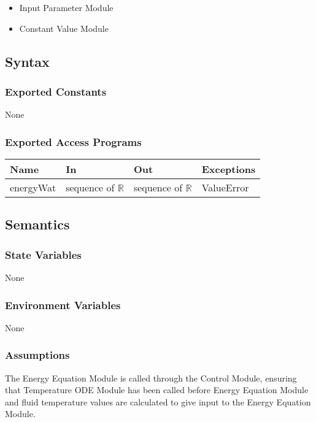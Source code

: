 \documentclass[12pt, titlepage]{article}
\begin{document}
\begin{itemize}
    \item Input Parameter Module
    \item Constant Value Module
\end{itemize}

\subsection{Syntax}

\subsubsection{Exported Constants}
None

\subsubsection{Exported Access Programs}

\begin{center}
\begin{tabular}{p{1.9cm} p{5cm} p{4cm} p{3.5cm}}
\hline
\textbf{Name} & \textbf{In} & \textbf{Out} & \textbf{Exceptions} \\
\hline
energyWat & sequence of $\mathbb{R}$ & sequence of $\mathbb{R}$ & ValueError \\   
\hline
\end{tabular}
\end{center}

\subsection{Semantics}

\subsubsection{State Variables}

None

\subsubsection{Environment Variables}

None  

\subsubsection{Assumptions}

The Energy Equation Module is called through the Control Module, ensuring that Temperature ODE Module has been called before Energy Equation Module and fluid temperature values are calculated to give input to the Energy Equation Module.
\end{document}
